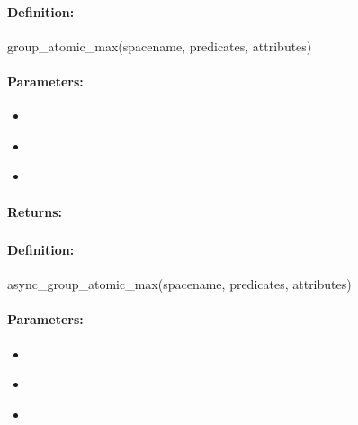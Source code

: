 \paragraph{Definition:}
\begin{rubycode}
group_atomic_max(spacename, predicates, attributes)
\end{rubycode}

\paragraph{Parameters:}
\begin{itemize}[noitemsep]
\item {}\\

\item {}\\

\item {}\\

\end{itemize}

\paragraph{Returns:}


\pagebreak
\subsubsection{}
\label{api:ruby:async_group_atomic_max}


\paragraph{Definition:}
\begin{rubycode}
async_group_atomic_max(spacename, predicates, attributes)
\end{rubycode}

\paragraph{Parameters:}
\begin{itemize}[noitemsep]
\item {}\\

\item {}\\

\item {}\\

\end{itemize}

